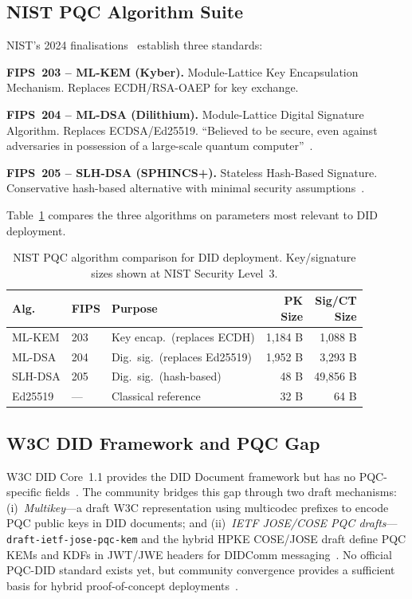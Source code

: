 \documentclass[sigconf,nonacm]{acmart}
\begin{document}
\subsection{NIST PQC Algorithm Suite}

NIST's 2024 finalisations~\cite{nist204,ping2024federal} establish
three standards:

\textbf{FIPS~203 -- ML-KEM (Kyber).}  Module-Lattice Key Encapsulation
Mechanism.  Replaces ECDH/RSA-OAEP for key exchange.

\textbf{FIPS~204 -- ML-DSA (Dilithium).}  Module-Lattice Digital
Signature Algorithm.  Replaces ECDSA/Ed25519.  ``Believed to be
secure, even against adversaries in possession of a large-scale
quantum computer''~\cite{nist204}.

\textbf{FIPS~205 -- SLH-DSA (SPHINCS+).}  Stateless Hash-Based
Signature.  Conservative hash-based alternative with minimal security
assumptions~\cite{ping2024federal}.

Table~\ref{tab:pqc-alg} compares the three algorithms on parameters
most relevant to DID deployment.

\begin{table}[h]
\caption{NIST PQC algorithm comparison for DID deployment.
  Key/signature sizes shown at NIST Security Level~3.}
\label{tab:pqc-alg}
\small
\begin{tabularx}{\columnwidth}{@{} l l >{\raggedright\arraybackslash}X r r @{}}
\toprule
\textbf{Alg.} & \textbf{FIPS} & \textbf{Purpose} &
\makecell[r]{\textbf{PK}\\Size} &
\makecell[r]{\textbf{Sig/CT}\\Size} \\
\midrule
ML-KEM  & 203 & Key encap.\ (replaces ECDH)    & 1{,}184 B & 1{,}088 B \\
ML-DSA  & 204 & Dig.\ sig.\ (replaces Ed25519) & 1{,}952 B & 3{,}293 B \\
SLH-DSA & 205 & Dig.\ sig.\ (hash-based)       &      48 B & 49{,}856 B \\
Ed25519 & ---  & Classical reference            &      32 B &      64 B \\
\bottomrule
\end{tabularx}
\end{table}

\subsection{W3C DID Framework and PQC Gap}

W3C DID Core~1.1 provides the DID Document framework but has no
PQC-specific fields~\cite{linkedin2024}.  The community bridges this
gap through two draft mechanisms: (i)~\textit{Multikey}---a draft W3C
representation using multicodec prefixes to encode PQC public keys in
DID documents; and (ii)~\textit{IETF JOSE/COSE PQC drafts}---
\texttt{draft-ietf-jose-pqc-kem} and the hybrid HPKE COSE/JOSE draft
define PQC KEMs and KDFs in JWT/JWE headers for DIDComm
messaging~\cite{linkedin2024}.  No
official PQC-DID standard exists yet, but community convergence
provides a sufficient basis for hybrid proof-of-concept
deployments~\cite{linkedin2024,frontiers2024}.
\end{document}
